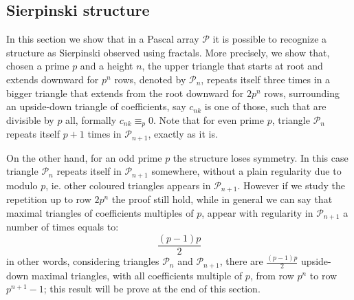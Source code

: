 \documentclass[11pt,a4paper]{article} %
\begin{document}
    \subsection{Sierpinski structure}

    In this section we show that in a Pascal array $\mathcal{P}$ it is
    possible to recognize a structure as Sierpinski observed using
    fractals. More precisely, we show that, chosen a prime $p$ and a
    height $n$, the upper triangle that starts at root and extends
    downward for $p^n$ rows, denoted by $\mathcal{P}_n$, repeats
    itself three times in a bigger triangle that extends from the root
    downward for $2p^{n}$ rows, surrounding an upside-down triangle of
    coefficients, say $c_{nk}$ is one of those, such that are divisible
    by $p$ all, formally $c_{nk} \equiv_p 0$. Note that for even prime
    $p$, triangle $\mathcal{P}_n$ repeats itself $p+1$ times in
    $\mathcal{P}_{n+1}$, exactly as it is.
    
    On the other hand, for an odd prime $p$ the structure loses
    symmetry. In this case triangle $\mathcal{P}_n$ repeats itself in
    $\mathcal{P}_{n+1}$ somewhere, without a plain regularity due to
    modulo $p$, ie. other coloured triangles appears in
    $\mathcal{P}_{n+1}$.  However if we study the repetition up to row
    $2p^n$ the proof still hold, while in general we can say that
    maximal triangles of coefficients multiples of $p$, appear with regularity
    in $\mathcal{P}_{n+1}$ a number of times equals to:
    \begin{displaymath}
        \frac{(p-1)p}{2}
    \end{displaymath}
    in other words, considering triangles $\mathcal{P}_{n}$ and
    $\mathcal{P}_{n+1}$, there are $\frac{(p-1)p}{2}$ upside-down
    maximal triangles, with all coefficients multiple of $p$, from row $p^n$
    to row $p^{n+1}-1$; this result will be prove at the end of this 
    section.
\end{document}

